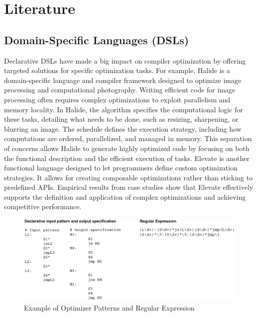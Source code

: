 \chapter[Literature Review]{Literature}

\section{Domain-Specific Languages (DSLs)}
Declarative DSLs have made a big impact on compiler optimization by offering targeted solutions for specific optimization tasks. For example, Halide \cite{Jonathan2018} is a domain-specific language and compiler framework designed to optimize image processing and computational photography. Writing efficient code for image processing often requires complex optimizations to exploit parallelism and memory locality. In Halide, the algorithm specifies the computational logic for these tasks, detailing what needs to be done, such as resizing, sharpening, or blurring an image. The schedule defines the execution strategy, including how computations are ordered, parallelized, and managed in memory. This separation of concerns allows Halide to generate highly optimized code by focusing on both the functional description and the efficient execution of tasks. Elevate \cite{Hagedorn2020} is another functional language designed to let programmers define custom optimization strategies. It allows for creating composable optimizations rather than sticking to predefined APIs. Empirical results from case studies show that Elevate effectively supports the definition and application of complex optimizations and achieving competitive performance.

\begin{figure}[h]
    \centering
    \includegraphics[width=1\textwidth]{Packages/regex.png}
    \caption{Example of Optimizer Patterns and Regular Expression \cite{Spinellis1999}}
    \label{figure:regex}
\end{figure}

